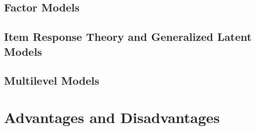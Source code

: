 \subsection{Factor Models}

\subsection{Item Response Theory and Generalized Latent Models}

\subsection{Multilevel Models}



\section{Advantages and Disadvantages}